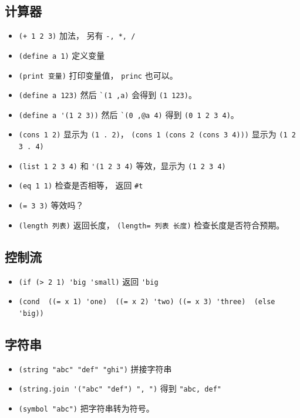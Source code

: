 \subsection{计算器}
\begin{itemize}
\item \verb`(+ 1 2 3)` 加法， 另有 \verb`-, *, /`
\item \verb`(define a 1)` 定义变量
\item \verb`(print 变量)` 打印变量值， \verb`princ` 也可以。
\item \verb`(define a 123)` 然后 \verb|`(1 ,a)| 会得到 \verb`(1 123)`。
\item \verb`(define a '(1 2 3))` 然后 \verb|`(0 ,@a 4)| 得到 \verb`(0 1 2 3 4)`。
\item \verb`(cons 1 2)` 显示为 \verb`(1 . 2)`， \verb`(cons 1 (cons 2 (cons 3 4)))` 显示为 \verb`(1 2 3 . 4)`
\item \verb`(list 1 2 3 4)` 和 \verb`'(1 2 3 4)` 等效，显示为 \verb`(1 2 3 4)`
\item \verb`(eq 1 1)` 检查是否相等， 返回 \verb`#t`
\item \verb`(= 3 3)` 等效吗？
\item \verb`(length 列表)` 返回长度， \verb`(length= 列表 长度)` 检查长度是否符合预期。
\end{itemize}

\subsection{控制流}
\begin{itemize}
\item \verb`(if (> 2 1) 'big 'small)` 返回 \verb`'big`
\item \verb`(cond  ((= x 1) 'one)  ((= x 2) 'two) ((= x 3) 'three)  (else 'big))`
\end{itemize}

\subsection{字符串}
\begin{itemize}
\item \verb`(string "abc" "def" "ghi")` 拼接字符串
\item \verb`(string.join '("abc" "def") ", ")` 得到 \verb`"abc, def"`
\item \verb`(symbol "abc")` 把字符串转为符号。
\end{itemize}


